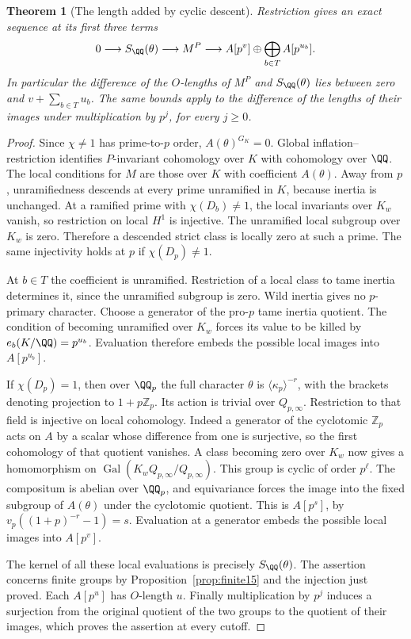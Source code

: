 \documentclass[a4paper,11pt]{article}
\newtheorem{theorem}[proposition]{Theorem}
\theoremstyle{definition}
\theoremstyle{remark}
\newcommand{\ZZ}{\mathbb Z}\newcommand{\ord}{\operatorname{ord}}
\numberwithin{equation}{section}
\begin{document}
\begin{theorem}[The length added by cyclic descent]
\leavevmode\label{thm:descentcost665}
Restriction gives an exact sequence at its first three terms
\[
 0\longrightarrow S_{\QQ}(\theta)\longrightarrow M^P
   \longrightarrow A[p^v]\oplus\bigoplus_{b\in T}A[p^{u_b}].
\]
In particular the difference of the \(O\)-lengths of \(M^P\)
and \(S_{\QQ}(\theta)\) lies between zero and \(v+\sum_{b\in T}u_b\).
The same bounds apply to the difference of the lengths of their
images under multiplication by \(p^j\), for every \(j\ge0\).
\end{theorem}
\begin{proof}
Since \(\chi\ne1\) has prime-to-\(p\) order, \(A(\theta)^{G_K}=0\).
Global inflation--restriction identifies \(P\)-invariant
cohomology over \(K\) with cohomology over \(\QQ\).
The local conditions for \(M\) are those over \(K\) with
coefficient \(A(\theta)\). Away from \(p\), unramifiedness
descends at every prime unramified in \(K\), because inertia
is unchanged. At a ramified prime with \(\chi(D_b)\ne1\),
the local invariants over \(K_w\) vanish, so restriction on
local \(H^1\) is injective. The unramified local subgroup over
\(K_w\) is zero. Therefore a descended strict class is locally
zero at such a prime. The same injectivity holds at \(p\) if
\(\chi(D_p)\ne1\).

At \(b\in T\) the coefficient is unramified. Restriction of a
local class to tame inertia determines it, since the unramified
subgroup is zero. Wild inertia gives no \(p\)-primary character.
Choose a generator of the pro-\(p\) tame inertia quotient.
The condition of becoming unramified over \(K_w\) forces its
value to be killed by \(e_b(K/\QQ)=p^{u_b}\). Evaluation
therefore embeds the possible local images into \(A[p^{u_b}]\).

If \(\chi(D_p)=1\), then over \(\QQ_p\) the full character
\(\theta\) is \(\langle\kappa_p\rangle^{-r}\), with the brackets
denoting projection to \(1+p\ZZ_p\). Its action is trivial over
\(Q_{p,\infty}\). Restriction to that field is injective on local
cohomology. Indeed a generator of the cyclotomic \(\ZZ_p\) acts
on \(A\) by a scalar whose difference from one is surjective,
so the first cohomology of that quotient vanishes. A class
becoming zero over \(K_w\) now gives a homomorphism on
\(\operatorname{Gal}(K_wQ_{p,\infty}/Q_{p,\infty})\).
This group is cyclic of order \(p^\ell\). The compositum is
abelian over \(\QQ_p\), and equivariance forces the image into
the fixed subgroup of \(A(\theta)\) under the cyclotomic
quotient. This is \(A[p^s]\), by
\(v_p((1+p)^{-r}-1)=s\). Evaluation at a generator embeds
the possible local images into \(A[p^v]\).

The kernel of all these local evaluations is precisely
\(S_{\QQ}(\theta)\). The assertion concerns finite groups
by Proposition~\ref{prop:finite15} and the injection just
proved. Each \(A[p^u]\) has \(O\)-length \(u\). Finally
multiplication by \(p^j\) induces a surjection from the
original quotient of the two groups to the quotient of their
images, which proves the assertion at every cutoff.
\end{proof}
\end{document}
